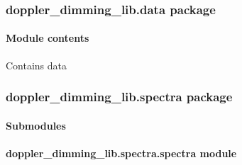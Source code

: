 \documentclass[letterpaper,10pt,english]{sphinxmanual}
\begin{document}
\subsubsection{doppler\_dimming\_lib.data package}
\label{\detokenize{doppler_dimming_lib.data:doppler-dimming-lib-data-package}}\label{\detokenize{doppler_dimming_lib.data::doc}}

\paragraph{Module contents}
\label{\detokenize{doppler_dimming_lib.data:module-doppler_dimming_lib.data}}\label{\detokenize{doppler_dimming_lib.data:module-contents}}
\sphinxAtStartPar
Contains data

\sphinxstepscope


\subsubsection{doppler\_dimming\_lib.spectra package}
\label{\detokenize{doppler_dimming_lib.spectra:doppler-dimming-lib-spectra-package}}\label{\detokenize{doppler_dimming_lib.spectra::doc}}

\paragraph{Submodules}
\label{\detokenize{doppler_dimming_lib.spectra:submodules}}

\paragraph{doppler\_dimming\_lib.spectra.spectra module}
\label{\detokenize{doppler_dimming_lib.spectra:module-doppler_dimming_lib.spectra.spectra}}\label{\detokenize{doppler_dimming_lib.spectra:doppler-dimming-lib-spectra-spectra-module}}
\end{document}
